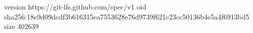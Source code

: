 version https://git-lfs.github.com/spec/v1
oid sha256:18e9d09dcdf3b616315ea7553628e76d9739f621c23cc50136b4e5a4f6913bd5
size 402639
